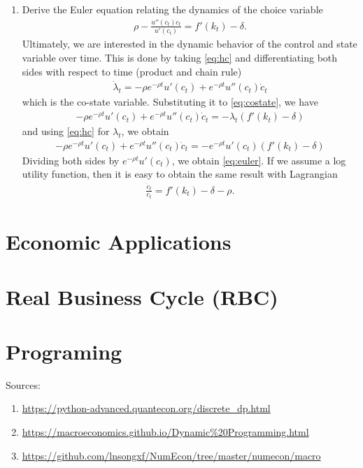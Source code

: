 \documentclass[11pt,a4paper]{book}
\theoremstyle{definition}\newtheorem{definition}{Definition}
\theoremstyle{definition}\newtheorem{fact}{Fact}
\theoremstyle{definition}\newtheorem{remark}{Remark}
\theoremstyle{definition}\newtheorem{ex}{Ex.}
\theoremstyle{definition}\newtheorem{project}{Project}
\theoremstyle{definition}\newtheorem{problem}{Problem}
\theoremstyle{definition}\newtheorem{example}{Example}
\numberwithin{theorem}{section}
\numberwithin{corollary}{chapter}
\numberwithin{assumption}{chapter}
\numberwithin{definition}{chapter}
\numberwithin{prop}{chapter}
\numberwithin{notation}{chapter}
\numberwithin{problem}{chapter}
\numberwithin{example}{chapter}
\numberwithin{fact}{chapter}
\numberwithin{ex}{chapter}
\begin{document}
\begin{enumerate}
		\item Derive the Euler equation relating the dynamics of the choice variable
		\begin{align}
			\rho - \frac{u''(c_t) \dot{c}_t}{u'(c_t)} = f'(k_t) - \delta. \label{eq:euler}
		\end{align}
		Ultimately, we are interested in the dynamic behavior of the control and state variable over time. This is done by taking \eqref{eq:hc} and differentiating both sides with respect to time (product and chain rule)
		\begin{align}
			\dot{\lambda}_t = -\rho e^{-\rho t} u'(c_t) + e^{-\rho t} u''(c_t) \dot{c}_t
		\end{align}
		which is the co-state variable. Substituting it to \eqref{eq:costate}, we have
		\begin{align*}
			-\rho e^{-\rho t} u'(c_t) + e^{-\rho t} u''(c_t) \dot{c}_t = -\lambda_t (f'(k_t)-\delta)
		\end{align*}
		and using \eqref{eq:hc} for $\lambda_t$, we obtain
		\begin{align*}
			-\rho e^{-\rho t} u'(c_t) + e^{-\rho t} u''(c_t) \dot{c}_t = - e^{-\rho t} u'(c_t) (f'(k_t)-\delta)
		\end{align*}
		Dividing both sides by $e^{-\rho t} u'(c_t)$, we obtain \eqref{eq:euler}. If we assume a log utility function, then it is easy to obtain the same result with Lagrangian
		\begin{align*}
			\frac{\dot{c}_t}{c_t} = f'(k_t) - \delta - \rho. 
		\end{align*}
	\end{enumerate}
	
	\section{Economic Applications}
	
	\section{Real Business Cycle (RBC)}
	
	
	\section{Programing}
	Sources:
	\begin{enumerate}
		\item \url{https://python-advanced.quantecon.org/discrete_dp.html}
		\item \url{https://macroeconomics.github.io/Dynamic%20Programming.html}
		\item \url{https://github.com/lnsongxf/NumEcon/tree/master/numecon/macro}
	\end{enumerate}
\end{document}
